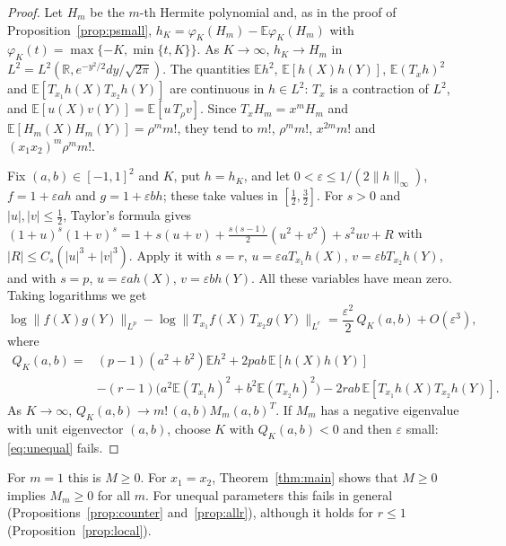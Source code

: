 \documentclass[11pt]{amsart}
\theoremstyle{definition}
\newcommand{\E}{\mathbb{E}}
\newcommand{\R}{\mathbb{R}}
\begin{document}
\begin{proof}
Let $H_m$ be the $m$-th Hermite polynomial and, as in the proof of Proposition~\ref{prop:psmall},
$h_K=\varphi_K(H_m)-\E\varphi_K(H_m)$ with $\varphi_K(t)=\max\{-K,\min\{t,K\}\}$. As $K\to\infty$, $h_K\to H_m$ in
$L^2=L^2(\R,e^{-y^2/2}dy/\sqrt{2\pi})$. The quantities $\E h^2$, $\E[h(X)h(Y)]$, $\E(T_xh)^2$ and
$\E[T_{x_1}h(X)T_{x_2}h(Y)]$ are continuous in $h\in L^2$: $T_x$ is a contraction of $L^2$, and $\E[u(X)v(Y)]=\E[u\,T_\rho v]$. Since $T_xH_m=x^mH_m$ and
$\E[H_m(X)H_m(Y)]=\rho^m m!$, they tend to $m!$, $\rho^mm!$, $x^{2m}m!$ and $(x_1x_2)^m\rho^mm!$.

Fix $(a,b)\in[-1,1]^2$ and $K$, put $h=h_K$, and let $0<\varepsilon\le1/(2\|h\|_\infty)$, $f=1+\varepsilon ah$ and
$g=1+\varepsilon bh$; these take values in $[\frac12,\frac32]$. For $s>0$ and $|u|,|v|\le\frac12$, Taylor's formula gives
$(1+u)^s(1+v)^s=1+s(u+v)+\frac{s(s-1)}2(u^2+v^2)+s^2uv+R$ with $|R|\le C_s(|u|^3+|v|^3)$. Apply it with $s=r$,
$u=\varepsilon aT_{x_1}h(X)$, $v=\varepsilon bT_{x_2}h(Y)$, and with $s=p$, $u=\varepsilon ah(X)$, $v=\varepsilon bh(Y)$.
All these variables have mean zero. Taking logarithms we get
\[
\log\|f(X)g(Y)\|_{L^p}-\log\|T_{x_1}f(X)\,T_{x_2}g(Y)\|_{L^r}=\frac{\varepsilon^2}2\,Q_K(a,b)+O(\varepsilon^3),
\]
where
\begin{align*}
Q_K(a,b)={}&(p-1)(a^2+b^2)\E h^2+2pab\,\E[h(X)h(Y)]\\
&-(r-1)\big(a^2\E(T_{x_1}h)^2+b^2\E(T_{x_2}h)^2\big)-2rab\,\E[T_{x_1}h(X)T_{x_2}h(Y)].
\end{align*}
As $K\to\infty$, $Q_K(a,b)\to m!\,(a,b)M_m(a,b)^T$. If $M_m$ has a negative eigenvalue with unit eigenvector $(a,b)$,
choose $K$ with $Q_K(a,b)<0$ and then $\varepsilon$ small: \eqref{eq:unequal} fails.
\end{proof}

For $m=1$ this is $M\ge0$. For $x_1=x_2$, Theorem~\ref{thm:main} shows that $M\ge0$ implies $M_m\ge0$ for all $m$. For
unequal parameters this fails in general (Propositions~\ref{prop:counter} and~\ref{prop:allr}), although it holds for
$r\le1$ (Proposition~\ref{prop:local}).
\end{document}
